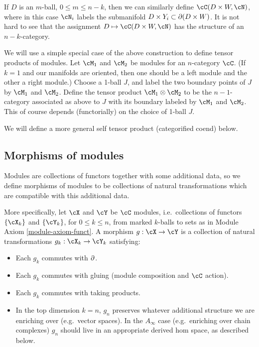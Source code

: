 \medskip

If $D$ is an $m$-ball, $0\le m \le n-k$, then we can similarly define
$\cC(D\times W, \cN)$, where in this case $\cN_i$ labels the submanifold 
$D\times Y_i \subset \partial(D\times W)$.
It is not hard to see that the assignment $D \mapsto \cC(D\times W, \cN)$
has the structure of an $n{-}k$-category.

\medskip

We will use a simple special case of the above 
construction to define tensor products 
of modules.
Let $\cM_1$ and $\cM_2$ be modules for an $n$-category $\cC$.
(If $k=1$ and our manifolds are oriented, then one should be 
a left module and the other a right module.)
Choose a 1-ball $J$, and label the two boundary points of $J$ by $\cM_1$ and $\cM_2$.
Define the tensor product $\cM_1 \tensor \cM_2$ to be the 
$n{-}1$-category associated as above to $J$ with its boundary labeled by $\cM_1$ and $\cM_2$.
This of course depends (functorially)
on the choice of 1-ball $J$.

We will define a more general self tensor product (categorified coend) below.




\subsection{Morphisms of modules}
\label{ss:module-morphisms}

Modules are collections of functors together with some additional data, so we define morphisms
of modules to be collections of natural transformations which are compatible with this
additional data.

More specifically, let $\cX$ and $\cY$ be $\cC$ modules, i.e.\ collections of functors
$\{\cX_k\}$ and $\{\cY_k\}$, for $0\le k\le n$, from marked $k$-balls to sets 
as in Module Axiom \ref{module-axiom-funct}.
A morphism $g:\cX\to\cY$ is a collection of natural transformations $g_k:\cX_k\to\cY_k$
satisfying:
\begin{itemize}
\item Each $g_k$ commutes with $\partial$.
\item Each $g_k$ commutes with gluing (module composition and $\cC$ action).
\item Each $g_k$ commutes with taking products.
\item In the top dimension $k=n$, $g_n$ preserves whatever additional structure we are enriching over (e.g.\ vector
spaces).
In the $A_\infty$ case (e.g.\ enriching over chain complexes) $g_n$ should live in 
an appropriate derived hom space, as described below.
\end{itemize}


